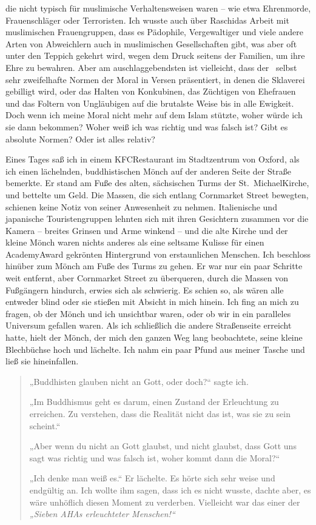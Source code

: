 \documentclass[12pt]{memoir}
\begin{document}
die nicht typisch für muslimische Verhaltensweisen waren –
wie etwa Ehrenmorde, Frauenschläger oder Terroristen.
Ich wusste auch über Raschidas Arbeit mit muslimischen Frauengruppen,
dass es Pädophile, Vergewaltiger und viele andere Arten von Abweichlern
auch in muslimischen Gesellschaften gibt,
was aber oft unter den Teppich gekehrt wird,
wegen dem Druck seitens der Familien, um ihre Ehre zu bewahren.
Aber am auschlaggebendsten ist vielleicht,
dass der \Quran\ selbst sehr zweifelhafte Normen
der Moral in Versen präsentiert,
in denen die Sklaverei gebilligt wird,
oder das Halten von Konkubinen, das Züchtigen von Ehefrauen
und das Foltern von Ungläubigen auf die brutalste Weise bis in alle Ewigkeit.
Doch wenn ich meine Moral nicht mehr auf dem Islam stützte,
woher würde ich sie dann bekommen?
Woher weiß ich was richtig und was falsch ist?
Gibt es absolute Normen? Oder ist alles relativ?

Eines Tages saß ich in einem KFC\–Restaurant im Stadtzentrum von Oxford,
als ich einen lächelnden, buddhistischen Mönch
auf der anderen Seite der Straße bemerkte.
Er stand am Fuße des alten, sächsischen Turms der St.\ Michael\–Kirche,
und bettelte um Geld.
Die Massen, die sich entlang Cornmarket Street bewegten,
schienen keine Notiz von seiner Anwesenheit zu nehmen.
Italienische und japanische Touristengruppen
lehnten sich mit ihren Gesichtern zusammen vor die Kamera –
breites Grinsen und Arme winkend –
und die alte Kirche und der kleine Mönch waren nichts anderes
als eine seltsame Kulisse für einen Academy\–Award
gekrönten Hintergrund von erstaunlichen Menschen.
Ich beschloss hinüber zum Mönch am Fuße des Turms zu gehen.
Er war nur ein paar Schritte weit entfernt,
aber Cornmarket Street zu überqueren,
durch die Massen von Fußgängern hindurch,
erwies sich als schwierig.
Es schien so, als wären alle entweder blind
oder sie stießen mit Absicht in mich hinein.
Ich fing an mich zu fragen,
ob der Mönch und ich unsichtbar waren,
oder ob wir in ein paralleles Universum gefallen waren.
Als ich schließlich die andere Straßenseite erreicht hatte,
hielt der Mönch, der mich den ganzen Weg lang beobachtete,
seine kleine Blechbüchse hoch und lächelte.
Ich nahm ein paar Pfund aus meiner Tasche und ließ sie hineinfallen.

\begin{quote}
„Buddhisten glauben nicht an Gott, oder doch?“ sagte ich.

„Im Buddhismus geht es darum, einen Zustand der Erleuchtung zu erreichen.
Zu verstehen, dass die Realität nicht das ist, was sie zu sein scheint.“

„Aber wenn du nicht an Gott glaubst,
und nicht glaubst, dass Gott uns sagt was richtig und was falsch ist,
woher kommt dann die Moral?“

„Ich denke man weiß es.“ Er lächelte.
Es hörte sich sehr weise und endgültig an.
Ich wollte ihm sagen, dass ich es nicht wusste,
dachte aber, es wäre unhöflich diesen Moment zu verderben.
Vielleicht war das einer der \emph{„Sieben AHAs erleuchteter Menschen!“}
\end{quote}
\end{document}
